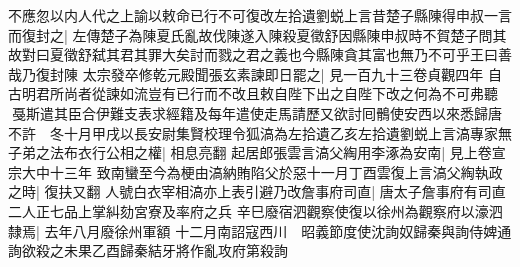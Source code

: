 不應忽以内人代之上諭以敕命已行不可復改左拾遺劉蜕上言昔楚子縣陳得申叔一言而復封之|{
	左傳楚子為陳夏氏亂故伐陳遂入陳殺夏徵舒因縣陳申叔時不賀楚子問其故對曰夏徵舒弑其君其罪大矣討而戮之君之義也今縣陳貪其富也無乃不可乎王曰善哉乃復封陳}
太宗發卒修乾元殿聞張玄素諫即日罷之|{
	見一百九十三卷貞觀四年}
自古明君所尚者從諫如流豈有已行而不改且敕自陛下出之自陛下改之何為不可弗聽　戞斯遣其臣合伊難支表求經籍及每年遣使走馬請歷又欲討囘鶻使安西以來悉歸唐不許　冬十月甲戌以長安尉集賢校理令狐滈為左拾遺乙亥左拾遺劉蜕上言滈專家無子弟之法布衣行公相之權|{
	相息亮翻}
起居郎張雲言滈父綯用李涿為安南|{
	見上卷宣宗大中十三年}
致南蠻至今為梗由滈納賄陷父於惡十一月丁酉雲復上言滈父綯執政之時|{
	復扶又翻}
人號白衣宰相滈亦上表引避乃改詹事府司直|{
	唐太子詹事府有司直二人正七品上掌糾劾宮寮及率府之兵}
辛巳廢宿泗觀察使復以徐州為觀察府以濠泗隸焉|{
	去年八月廢徐州軍額}
十二月南詔寇西川　昭義節度使沈詢奴歸秦與詢侍婢通詢欲殺之未果乙酉歸秦結牙將作亂攻府第殺詢

